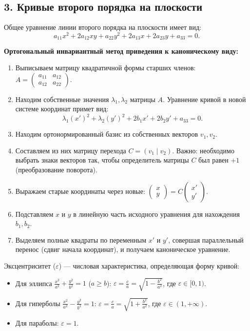 \subsection*{3. Кривые второго порядка на плоскости}

Общее уравнение линии второго порядка на плоскости имеет вид:
\[
a_{11}x^2 + 2a_{12}xy + a_{22}y^2 + 2a_{13}x + 2a_{23}y + a_{33} = 0.
\]

\noindent\textbf{Ортогональный инвариантный метод приведения к каноническому виду:}
\begin{enumerate}
    \item Выписываем матрицу квадратичной формы старших членов: $A = \begin{pmatrix} a_{11} & a_{12} \\ a_{12} & a_{22} \end{pmatrix}$.
    \item Находим собственные значения $\lambda_1, \lambda_2$ матрицы $A$. Уравнение кривой в новой системе координат примет вид:
    \[
    \lambda_1 (x')^2 + \lambda_2 (y')^2 + 2b_1 x' + 2b_2 y' + a_{33} = 0.
    \]
    \item Находим ортонормированный базис из собственных векторов $v_1, v_2$.
    \item Составляем из них матрицу перехода $C = (v_1 \mid v_2)$. Важно: необходимо выбрать знаки векторов так, чтобы определитель матрицы $C$ был равен $+1$ (преобразование поворота).
    \item Выражаем старые координаты через новые: $\begin{pmatrix} x \\ y \end{pmatrix} = C \begin{pmatrix} x' \\ y' \end{pmatrix}$.
    \item Подставляем $x$ и $y$ в линейную часть исходного уравнения для нахождения $b_1, b_2$.
    \item Выделяем полные квадраты по переменным $x'$ и $y'$, совершая параллельный перенос (сдвиг начала координат), и получаем каноническое уравнение.
\end{enumerate}

\begin{definition}
Эксцентриситет ($\varepsilon$) — числовая характеристика, определяющая форму кривой:
\begin{itemize}
    \item Для эллипса $\frac{x^2}{a^2} + \frac{y^2}{b^2} = 1$ ($a \ge b$): $\varepsilon = \frac{c}{a} = \sqrt{1 - \frac{b^2}{a^2}}$, где $\varepsilon \in [0, 1)$.
    \item Для гиперболы $\frac{x^2}{a^2} - \frac{y^2}{b^2} = 1$: $\varepsilon = \frac{c}{a} = \sqrt{1 + \frac{b^2}{a^2}}$, где $\varepsilon \in (1, +\infty)$.
    \item Для параболы: $\varepsilon = 1$.
\end{itemize}
\end{definition}


